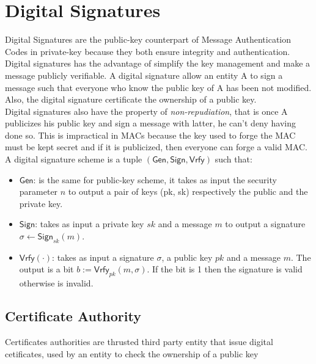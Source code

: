 \section{Digital Signatures}
Digital Signatures are the public-key counterpart of Message Authentication Codes in private-key because they both ensure integrity and authentication. Digital signatures has the advantage of simplify the key management and make a message publicly verifiable.
A digital signature allow an entity A to sign a message such that everyone who know the public key of A has been not modified. Also, the digital signature certificate the ownership of a public key.\\
Digital signatures also have the property of \emph{non-repudiation}, that is once A publicizes his public key and sign a message with latter, he can't deny having done so. This is impractical in MACs because the key used to forge the MAC must be kept secret and if it is publicized, then everyone can forge a valid MAC.\\
A digital signature scheme is a tuple $(\mathsf{Gen}, \mathsf{Sign}, \mathsf{Vrfy})$ such that:
\begin{itemize}
    \item{$\mathsf{Gen}$}: is the same for public-key scheme, it takes as input the security parameter $n$ to output a pair of keys (pk, sk) respectively the public and the private key.
    \item{$\mathsf{Sign}$}: takes as input a private key $sk$ and a message $m$ to output a signature $\sigma \leftarrow \mathsf{Sign}_{sk}(m)$.
    \item{$\mathsf{Vrfy}(\cdot)$}: takes as input a signature $\sigma$, a public key $pk$ and a message $m$. The output is a bit $b := \mathsf{Vrfy}_{pk}(m, \sigma)$. If the bit is 1 then the signature is valid otherwise is invalid.
\end{itemize}

\subsection{Certificate Authority}
Certificates authorities are thrusted third party entity that issue digital cetificates, used by an entity to check the ownership of a public key %
